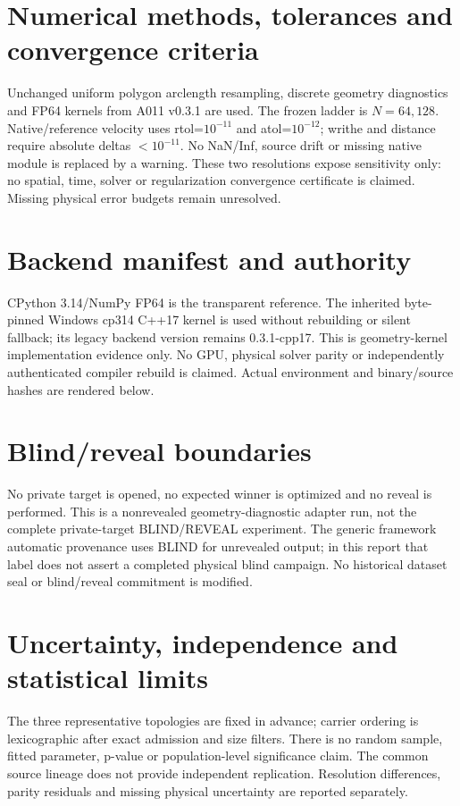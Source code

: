\documentclass[10pt,a4paper]{article}
\begin{document}
\section{Numerical methods, tolerances and convergence criteria}
Unchanged uniform polygon arclength resampling, discrete geometry diagnostics and FP64 kernels from A011 v0.3.1 are used. The frozen ladder is $N=64,128$. Native/reference velocity uses rtol=$10^{-11}$ and atol=$10^{-12}$; writhe and distance require absolute deltas $<10^{-11}$. No NaN/Inf, source drift or missing native module is replaced by a warning. These two resolutions expose sensitivity only: no spatial, time, solver or regularization convergence certificate is claimed. Missing physical error budgets remain unresolved.
\section{Backend manifest and authority}
CPython 3.14/NumPy FP64 is the transparent reference. The inherited byte-pinned Windows cp314 C++17 kernel is used without rebuilding or silent fallback; its legacy backend version remains 0.3.1-cpp17. This is geometry-kernel implementation evidence only. No GPU, physical solver parity or independently authenticated compiler rebuild is claimed. Actual environment and binary/source hashes are rendered below.
\section{Blind/reveal boundaries}
No private target is opened, no expected winner is optimized and no reveal is performed. This is a nonrevealed geometry-diagnostic adapter run, not the complete private-target BLIND/REVEAL experiment. The generic framework automatic provenance uses BLIND for unrevealed output; in this report that label does not assert a completed physical blind campaign. No historical dataset seal or blind/reveal commitment is modified.
\section{Uncertainty, independence and statistical limits}
The three representative topologies are fixed in advance; carrier ordering is lexicographic after exact admission and size filters. There is no random sample, fitted parameter, p-value or population-level significance claim. The common source lineage does not provide independent replication. Resolution differences, parity residuals and missing physical uncertainty are reported separately.
\end{document}
